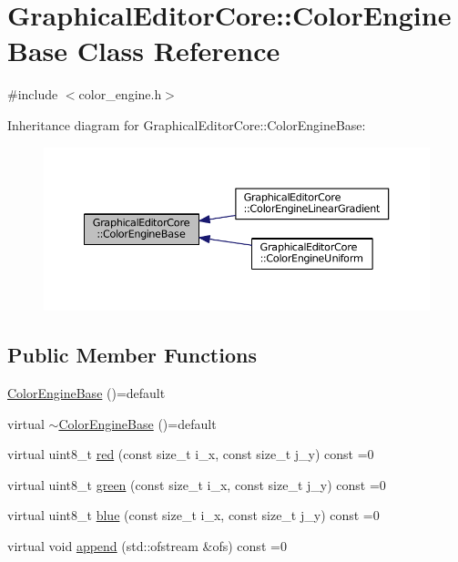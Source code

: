 \hypertarget{classGraphicalEditorCore_1_1ColorEngineBase}{}\section{Graphical\+Editor\+Core\+:\+:Color\+Engine\+Base Class Reference}
\label{classGraphicalEditorCore_1_1ColorEngineBase}


{\ttfamily \#include $<$color\+\_\+engine.\+h$>$}



Inheritance diagram for Graphical\+Editor\+Core\+:\+:Color\+Engine\+Base\+:
\nopagebreak
\begin{figure}[H]
\begin{center}
\leavevmode
\includegraphics[width=350pt]{classGraphicalEditorCore_1_1ColorEngineBase__inherit__graph}
\end{center}
\end{figure}
\subsection*{Public Member Functions}
\begin{DoxyCompactItemize}
\item 
\hyperlink{classGraphicalEditorCore_1_1ColorEngineBase_ae9aaf24b0d10206078560352af041058}{Color\+Engine\+Base} ()=default
\item 
virtual \hyperlink{classGraphicalEditorCore_1_1ColorEngineBase_a286d4bf617e3cfa67084e436020cd722}{$\sim$\+Color\+Engine\+Base} ()=default
\item 
virtual uint8\+\_\+t \hyperlink{classGraphicalEditorCore_1_1ColorEngineBase_a9d0b1a48ea117d8f47c43b9c63982dc5}{red} (const size\+\_\+t i\+\_\+x, const size\+\_\+t j\+\_\+y) const =0
\item 
virtual uint8\+\_\+t \hyperlink{classGraphicalEditorCore_1_1ColorEngineBase_a748837e34f2bf4409ae36a5d9ea02e27}{green} (const size\+\_\+t i\+\_\+x, const size\+\_\+t j\+\_\+y) const =0
\item 
virtual uint8\+\_\+t \hyperlink{classGraphicalEditorCore_1_1ColorEngineBase_a86a1c186366f3df9469e36421167f8cb}{blue} (const size\+\_\+t i\+\_\+x, const size\+\_\+t j\+\_\+y) const =0
\item 
virtual void \hyperlink{classGraphicalEditorCore_1_1ColorEngineBase_a4e6877385e1fc74277c73f953857d4ab}{append} (std\+::ofstream \&ofs) const =0
\end{DoxyCompactItemize}


